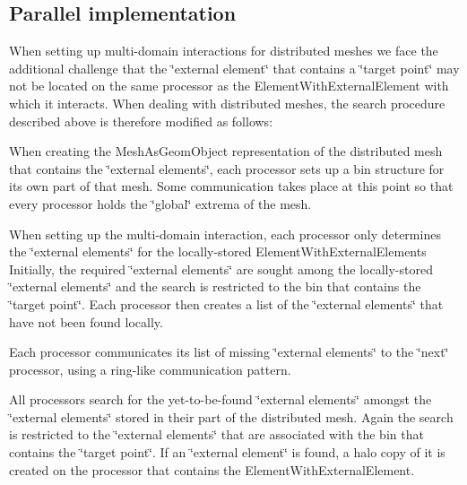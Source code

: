 \hypertarget{index_parallel}{}\subsection{Parallel implementation}\label{index_parallel}
When setting up multi-\/domain interactions for distributed meshes we face the additional challenge that the \char`\"{}external
element\char`\"{} that contains a \char`\"{}target point\char`\"{} may not be located on the same processor as the {\ttfamily Element\+With\+External\+Element} with which it interacts. When dealing with distributed meshes, the search procedure described above is therefore modified as follows\+:
\begin{DoxyEnumerate}
\item When creating the {\ttfamily Mesh\+As\+Geom\+Object} representation of the distributed mesh that contains the \char`\"{}external elements\char`\"{}, each processor sets up a bin structure for its own part of that mesh. Some communication takes place at this point so that every processor holds the \char`\"{}global\char`\"{} extrema of the mesh. ~\newline
~\newline

\item When setting up the multi-\/domain interaction, each processor only determines the \char`\"{}external elements\char`\"{} for the locally-\/stored {\ttfamily Element\+With\+External\+Elements} Initially, the required \char`\"{}external elements\char`\"{} are sought among the locally-\/stored \char`\"{}external elements\char`\"{} and the search is restricted to the bin that contains the \char`\"{}target point\char`\"{}. Each processor then creates a list of the \char`\"{}external elements\char`\"{} that have not been found locally. ~\newline
~\newline

\item Each processor communicates its list of missing \char`\"{}external elements\char`\"{} to the \char`\"{}next\char`\"{} processor, using a ring-\/like communication pattern. ~\newline
~\newline

\item All processors search for the yet-\/to-\/be-\/found \char`\"{}external
   elements\char`\"{} amongst the \char`\"{}external elements\char`\"{} stored in their part of the distributed mesh. Again the search is restricted to the \char`\"{}external elements\char`\"{} that are associated with the bin that contains the \char`\"{}target point\char`\"{}. If an \char`\"{}external element\char`\"{} is found, a halo copy of it is created on the processor that contains the {\ttfamily Element\+With\+External\+Element}. ~\newline
~\newline


\end{DoxyEnumerate}
